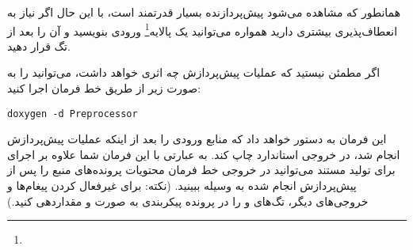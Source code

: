 همانطور که مشاهده می‌شود پیش‌پردازنده  بسیار قدرتمند است، با این حال اگر نیاز به انعطاف‌پذیری بیشتری 
دارید همواره می‌توانید یک پالایه\footnote{} ورودی بنویسید و آن را بعد از تگ  قرار دهید.

اگر مطمئن نیستید که عملیات پیش‌پردازش  چه اثری خواهد داشت،  می‌توانید  را به صورت زیر 
از طریق خط فرمان اجرا کنید:
\begin{latin}
\lstset{language=C++}  
\begin{lstlisting}[frame=single] 
doxygen -d Preprocessor
\end{lstlisting}
\end{latin}
این فرمان به  دستور خواهد داد که منابع ورودی را بعد از اینکه عملیات پیش‌پردازش انجام شد، در 
خروجی استاندارد چاپ کند. به عبارتی با این فرمان شما علاوه بر اجرای  برای تولید مستند می‌توانید در خروجی 
خط فرمان محتویات پرونده‌های منبع را پس از پیش‌پردازش انجام شده به وسیله  ببینید. (نکته: برای غیرفعال 
کردن پیغام‌ها و خروجی‌های دیگر، تگ‌های  و  را در پرونده پیکربندی 
به صورت  و  مقداردهی کنید.)
